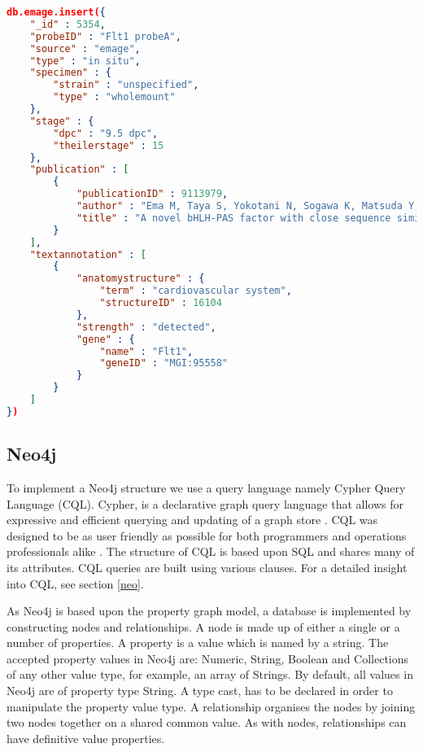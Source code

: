 \newpage
\begin{lstlisting}[language=json,caption=Example insertion of data into a MongoDB document., label=code:mongoinsert]
db.emage.insert({
    "_id" : 5354,
    "probeID" : "Flt1 probeA",
    "source" : "emage",
    "type" : "in situ",
    "specimen" : {
        "strain" : "unspecified",
        "type" : "wholemount"
    },
    "stage" : {
        "dpc" : "9.5 dpc",
        "theilerstage" : 15
    },
    "publication" : [ 
        {
            "publicationID" : 9113979,
            "author" : "Ema M, Taya S, Yokotani N, Sogawa K, Matsuda Y, Fujii-Kuriyama Y",
            "title" : "A novel bHLH-PAS factor with close sequence similarity to hypoxia-inducible factor 1alpha regulates the VEGF expression and is potentially involved in lung and vascular development."
        }
    ],
    "textannotation" : [ 
        {
            "anatomystructure" : {
                "term" : "cardiovascular system",
                "structureID" : 16104
            },
            "strength" : "detected",
            "gene" : {
                "name" : "Flt1",
                "geneID" : "MGI:95558"
            }
        }
    ]
})
\end{lstlisting} 


\subsection*{Neo4j}
To implement a Neo4j structure we use a query language namely Cypher Query Language (CQL). Cypher, is a declarative graph query language that allows for expressive and efficient querying and updating of a graph store \cite{nd}. CQL was designed to be as user friendly as possible for both programmers and operations professionals alike \cite{nd}. The structure of CQL is based upon SQL and shares many of its attributes. CQL queries are built using various clauses. For a detailed insight into CQL, see section \ref{neo}.

As Neo4j is based upon the property graph model, a database is implemented by constructing nodes and relationships. A node is made up of either a single or a number of properties. A property is a value which is named by a string. The accepted property values in Neo4j are: Numeric, String, Boolean and Collections of any other value type, for example, an array of Strings. By default, all values in Neo4j are of property type String. A type cast, has to be declared in order to manipulate the property value type. A relationship organises the nodes by joining two nodes together on a shared common value. As with nodes, relationships can have definitive value properties.

